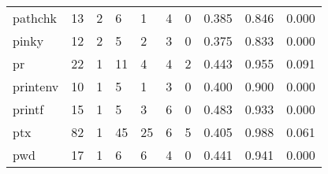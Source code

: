 \begin{longtable}{lp{1.3cm}p{1.3cm}p{1.3cm}p{1.3cm}p{1.3cm}p{1.3cm}p{1.3cm}p{1.3cm}p{1.3cm}}
pathchk   &                     13 &                                             2 &                                            6 &                                           1 &                                            4 &                                          0 &                                0.385 &                                  0.846 &                                0.000 \\
pinky     &                     12 &                                             2 &                                            5 &                                           2 &                                            3 &                                          0 &                                0.375 &                                  0.833 &                                0.000 \\
pr        &                     22 &                                             1 &                                           11 &                                           4 &                                            4 &                                          2 &                                0.443 &                                  0.955 &                                0.091 \\
printenv  &                     10 &                                             1 &                                            5 &                                           1 &                                            3 &                                          0 &                                0.400 &                                  0.900 &                                0.000 \\
printf    &                     15 &                                             1 &                                            5 &                                           3 &                                            6 &                                          0 &                                0.483 &                                  0.933 &                                0.000 \\
ptx       &                     82 &                                             1 &                                           45 &                                          25 &                                            6 &                                          5 &                                0.405 &                                  0.988 &                                0.061 \\
pwd       &                     17 &                                             1 &                                            6 &                                           6 &                                            4 &                                          0 &                                0.441 &                                  0.941 &                                0.000 \\

\end{longtable}
